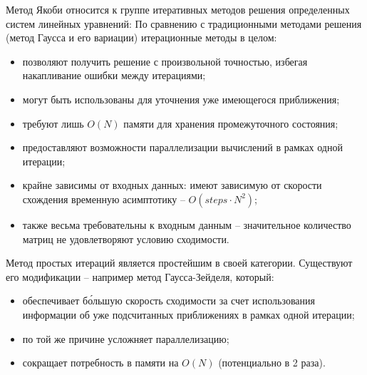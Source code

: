 \documentclass[lab1-report.tex]{subfiles}
\begin{document}
    Метод Якоби относится к группе итеративных методов решения определенных систем линейных уравнений:
    По сравнению с традиционными методами решения (метод Гаусса и его вариации) итерационные методы в целом:
    \begin{itemize}
        \item позволяют получить решение с произвольной точностью, избегая накапливание ошибки между итерациями;
        \item могут быть использованы для уточнения уже имеющегося приближения;
        \item требуют лишь $O(N)$ памяти для хранения промежуточного состояния;
        \item предоставляют возможности параллелизации вычислений в рамках одной итерации;
        \item крайне зависимы от входных данных: имеют зависимую от скорости схождения временную асимптотику
        -- $O(steps \cdot N^2)$;
        \item также весьма требовательны к входным данным -- значительное количество матриц не удовлетворяют
        условию сходимости.
    \end{itemize}
    Метод простых итераций является простейшим в своей категории.
    Существуют его модификации -- например метод Гаусса-Зейделя, который:
    \begin{itemize}
        \item обеспечивает б\'{о}льшую скорость сходимости за счет использования информации
        об уже подсчитанных приближениях в рамках одной итерации;
        \item по той же причине усложняет параллелизацию;
        \item сокращает потребность в памяти на $O(N)$ (потенциально в 2 раза).
    \end{itemize}
\end{document}
